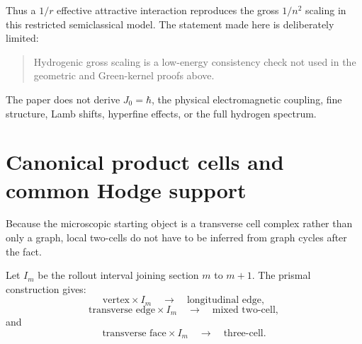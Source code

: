 \documentclass[11pt]{article}
\begin{document}
Thus a \(1/r\) effective attractive interaction reproduces the gross \(1/n^2\) scaling in this restricted semiclassical model. The statement made here is deliberately limited:

\begin{quote}
Hydrogenic gross scaling is a low-energy consistency check not used in the geometric and Green-kernel proofs above.
\end{quote}

The paper does not derive \(J_0=\hbar\), the physical electromagnetic coupling, fine structure, Lamb shifts, hyperfine effects, or the full hydrogen spectrum.

\section{Canonical product cells and common Hodge support}

Because the microscopic starting object is a transverse cell complex rather than only a graph, local two-cells do not have to be inferred from graph cycles after the fact.

Let \(I_m\) be the rollout interval joining section \(m\) to \(m+1\). The prismal construction gives:
\[
\text{vertex}\times I_m
\quad\rightarrow\quad
\text{longitudinal edge},
\]
\[
\text{transverse edge}\times I_m
\quad\rightarrow\quad
\text{mixed two-cell},
\]
and
\[
\text{transverse face}\times I_m
\quad\rightarrow\quad
\text{three-cell}.
\]
\end{document}
